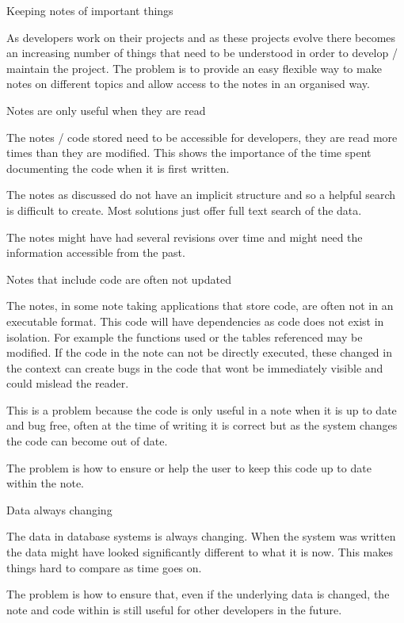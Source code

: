 \begin{problem}{Keeping notes of important things}

As developers work on their projects and as these projects evolve there
becomes an increasing number of things that need to be understood in
order to develop / maintain the project. The problem is to provide an
easy flexible way to make notes on different topics and allow access to
the notes in an organised way.

\end{problem}

\begin{problem}{Notes are only useful when they are read}

The notes / code stored need to be accessible for developers, they are read
more times than they are modified. This shows the importance of the time spent
documenting the code when it is first written.

The notes as discussed do not have an implicit structure and so a helpful
search is difficult to create. Most solutions just offer full text
search of the data.

The notes might have had several revisions over time and might need the
information accessible from the past.

\end{problem}


\begin{problem}{Notes that include code are often not
updated}

The notes, in some note taking applications that store code, are often not in an
executable format. This code will have dependencies as code does not exist in
isolation. For example the functions used or the tables referenced may be
modified. If the code in the note can not be directly executed, these changed
in the context can create bugs in the code that wont be immediately visible and
could mislead the reader.

This is a problem because the code is only useful in a note when it is
up to date and bug free, often at the time of writing it is correct but
as the system changes the code can become out of date.

The problem is how to ensure or help the user to keep this code up to
date within the note.

\end{problem}

\begin{problem}{Data always changing}

The data in database systems is always changing. When the system was
written the data might have looked significantly different to what it is
now. This makes things hard to compare as time goes on.

The problem is how to ensure that, even if the underlying data is
changed, the note and code within is still useful for other developers
in the future.

\end{problem}

